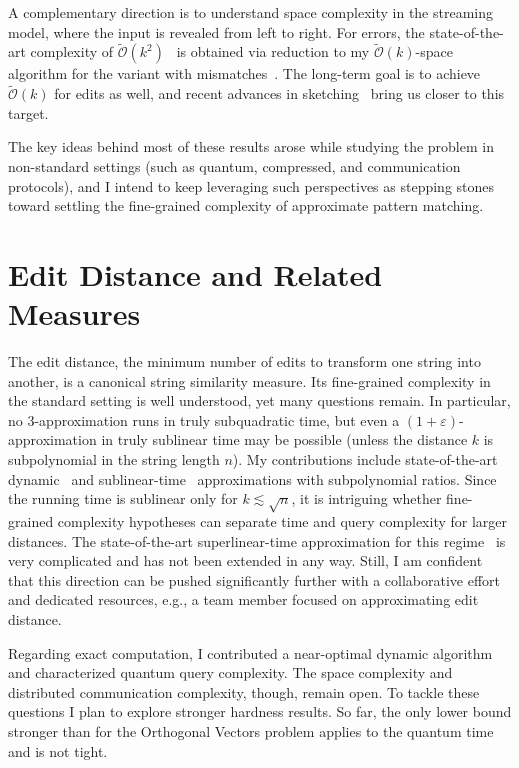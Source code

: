 \documentclass[a4paper,11pt]{article}
\newcommand{\eps}{\varepsilon}
\newcommand{\Ohtilde}{\tilde{\mathcal{O}}}
\begin{document}
A complementary direction is to understand space complexity in the streaming model, where the input is revealed from left to right. 
For errors, the state-of-the-art complexity of $\Ohtilde(k^2)$~\cite{BK23b} is obtained via reduction to my $\Ohtilde(k)$-space algorithm for the variant with mismatches~\cite{CKP19}. 
The long-term goal is to achieve $\Ohtilde(k)$ for edits as well, and recent advances in sketching~\cite{KS24} bring us closer to this target.  

The key ideas behind most of these results arose while studying the problem in non-standard settings (such as quantum, compressed, and communication protocols), and I intend to keep leveraging such perspectives as stepping stones toward settling the fine-grained complexity of approximate pattern matching.

\section{Edit Distance and Related Measures}

The edit distance, the minimum number of edits to transform one string into another, is a canonical string similarity measure. 
Its fine-grained complexity in the standard setting is well understood, yet many questions remain. 
In particular, no $3$-approximation runs in truly subquadratic time, but even a $(1+\eps)$-approximation in truly sublinear time may be possible (unless the distance $k$ is subpolynomial in the string length $n$).
My contributions include state-of-the-art dynamic~\cite{KMS23} and sublinear-time~\cite{GKKS22} approximations with subpolynomial ratios. 
Since the running time is sublinear only for $k \lesssim \sqrt{n}$, it is intriguing whether fine-grained complexity hypotheses can separate time and query complexity for larger distances.
The state-of-the-art superlinear-time approximation for this regime~\cite{AN20} is very complicated and has not been extended in any way.
Still, I am confident that this direction can be pushed significantly further with a collaborative effort and dedicated resources, e.g., a team member focused on approximating edit distance.

Regarding exact computation, I contributed a near-optimal dynamic algorithm~\cite{GK25} and characterized quantum query complexity. 
The space complexity and distributed communication complexity, though, remain open. 
To tackle these questions I plan to explore stronger hardness results. 
So far, the only lower bound stronger than for the Orthogonal Vectors problem applies to the quantum time~\cite{BPS21} and is not tight.  
\end{document}
